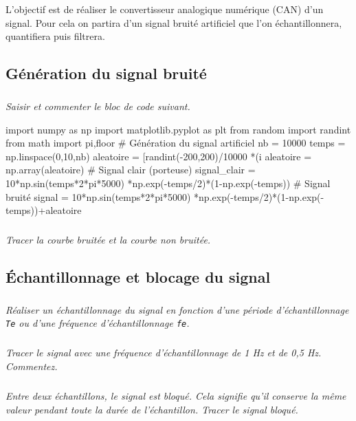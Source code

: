 \documentclass[10pt,fleqn]{article} %
\begin{document}

\vspace{7cm}
\pagestyle{fancy}
\thispagestyle{plain}


\def\columnseprulecolor{\color{ocre}}
\setlength{\columnseprule}{0.4pt} 
\begin{multicols}{2}
%
\begin{obj}
L'objectif est de réaliser le convertisseur analogique numérique (CAN) d'un signal. Pour cela on partira d'un signal bruité artificiel que l'on échantillonnera, quantifiera puis filtrera.
\end{obj}


\subsection*{Génération du signal bruité}

\subparagraph{}
\textit{Saisir et commenter le bloc de code suivant.}


\begin{py}
\begin{python}
import numpy as np
import matplotlib.pyplot as plt
from random import randint
from math import pi,floor
# Génération du signal artificiel
nb = 10000
temps = np.linspace(0,10,nb)
aleatoire = [randint(-200,200)/10000
    *(i%
aleatoire  = np.array(aleatoire)
# Signal clair (porteuse)
signal_clair = 10*np.sin(temps*2*pi*5000)
    *np.exp(-temps/2)*(1-np.exp(-temps))
# Signal bruité
signal = 10*np.sin(temps*2*pi*5000)
   *np.exp(-temps/2)*(1-np.exp(-temps))+aleatoire
\end{python}
\end{py}

\subparagraph{}
\textit{Tracer la courbe bruitée et la courbe non bruitée.}

\subsection*{Échantillonnage et blocage du signal}

\subparagraph{}
\textit{Réaliser un échantillonnage du signal en fonction d'une période d'échantillonnage \texttt{Te} ou d'une fréquence d'échantillonnage \texttt{fe}.}

\subparagraph{}
\textit{Tracer le signal avec une fréquence d'échantillonnage de 1 Hz et de 0,5 Hz. Commentez.}

\subparagraph{}
\textit{Entre deux échantillons, le signal est bloqué. Cela signifie qu'il conserve la même valeur pendant toute la durée de l'échantillon. Tracer le signal bloqué.}



\end{multicols}
\end{document}
